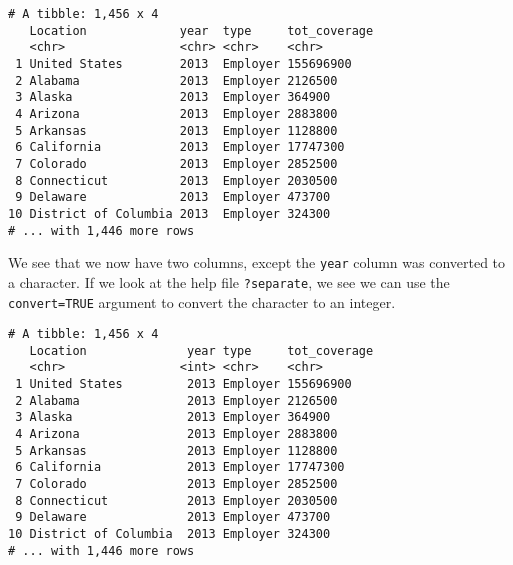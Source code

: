 \documentclass[]{article}
\newenvironment{Shaded}{\begin{snugshade}}{\end{snugshade}}
\newcommand{\DataTypeTok}[1]{\textcolor[rgb]{0.13,0.29,0.53}{#1}}
\newcommand{\KeywordTok}[1]{\textcolor[rgb]{0.13,0.29,0.53}{\textbf{#1}}}
\newcommand{\NormalTok}[1]{#1}
\newcommand{\OperatorTok}[1]{\textcolor[rgb]{0.81,0.36,0.00}{\textbf{#1}}}
\newcommand{\OtherTok}[1]{\textcolor[rgb]{0.56,0.35,0.01}{#1}}
\newcommand{\StringTok}[1]{\textcolor[rgb]{0.31,0.60,0.02}{#1}}
\begin{document}
\begin{Shaded}
\end{Shaded}

\begin{verbatim}
# A tibble: 1,456 x 4
   Location             year  type     tot_coverage
   <chr>                <chr> <chr>    <chr>       
 1 United States        2013  Employer 155696900   
 2 Alabama              2013  Employer 2126500     
 3 Alaska               2013  Employer 364900      
 4 Arizona              2013  Employer 2883800     
 5 Arkansas             2013  Employer 1128800     
 6 California           2013  Employer 17747300    
 7 Colorado             2013  Employer 2852500     
 8 Connecticut          2013  Employer 2030500     
 9 Delaware             2013  Employer 473700      
10 District of Columbia 2013  Employer 324300      
# ... with 1,446 more rows
\end{verbatim}

We see that we now have two columns, except the \texttt{year} column was
converted to a character. If we look at the help file
\texttt{?separate}, we see we can use the \texttt{convert=TRUE} argument
to convert the character to an integer.

\begin{Shaded}
\end{Shaded}

\begin{verbatim}
# A tibble: 1,456 x 4
   Location              year type     tot_coverage
   <chr>                <int> <chr>    <chr>       
 1 United States         2013 Employer 155696900   
 2 Alabama               2013 Employer 2126500     
 3 Alaska                2013 Employer 364900      
 4 Arizona               2013 Employer 2883800     
 5 Arkansas              2013 Employer 1128800     
 6 California            2013 Employer 17747300    
 7 Colorado              2013 Employer 2852500     
 8 Connecticut           2013 Employer 2030500     
 9 Delaware              2013 Employer 473700      
10 District of Columbia  2013 Employer 324300      
# ... with 1,446 more rows
\end{verbatim}
\end{document}
